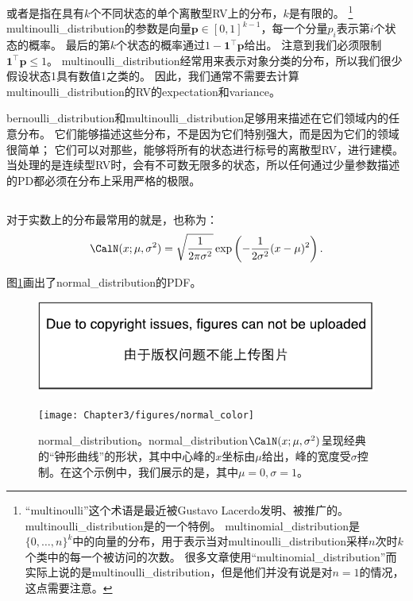 或者是指在具有$k$个不同状态的单个离散型\gls{RV}上的分布，$k$是有限的。
\footnote{``multinoulli''这个术语是最近被Gustavo Lacerdo发明、被\cite{MurphyBook2012}推广的。
\gls{multinoulli_distribution}是的一个特例。
\gls{multinomial_distribution}是$\{0,\ldots, n\}^k$中的向量的分布，用于表示当对\gls{multinoulli_distribution}采样$n$次时$k$个类中的每一个被访问的次数。
很多文章使用``\gls{multinomial_distribution}''而实际上说的是\gls{multinoulli_distribution}，但是他们并没有说是对$n=1$的情况，这点需要注意。}
\gls{multinoulli_distribution}的参数是向量$\bm{p} \in [0, 1]^{k-1}$，每一个分量$p_i$表示第$i$个状态的概率。
最后的第$k$个状态的概率通过$1-\bm{1}^\top \bm{p}$给出。
注意到我们必须限制$\bm{1}^\top\bm{p}\le 1$。
\gls{multinoulli_distribution}经常用来表示对象分类的分布，所以我们很少假设状态1具有数值1之类的。
因此，我们通常不需要去计算\gls{multinoulli_distribution}的\gls{RV}的\gls{expectation}和\gls{variance}。


\gls{bernoulli_distribution}和\gls{multinoulli_distribution}足够用来描述在它们领域内的任意分布。
它们能够描述这些分布，不是因为它们特别强大，而是因为它们的领域很简单；
它们可以对那些，能够将所有的状态进行标号的离散型\gls{RV}，进行建模。
当处理的是连续型\gls{RV}时，会有不可数无限多的状态，所以任何通过少量参数描述的\gls{PD}都必须在分布上采用严格的极限。

\subsection{}
\label{sec:gaussian_distribution}


对于实数上的分布最常用的就是，也称为：
\begin{equation}
\CalN(x; \mu, \sigma^2) = \sqrt{\frac{1}{2\pi \sigma^2}} \exp \left ( -\frac{1}{2\sigma^2} (x-\mu)^2 \right ).
\end{equation}

图\ref{fig:chap3_normal_color}画出了\gls{normal_distribution}的\gls{PDF}。
\begin{figure}[!htb]
\ifOpenSource
\centerline{\includegraphics{figure.pdf}}
\else
\centerline{\texttt{[image: Chapter3/figures/normal\_color]}}
\fi
\captionsetup{singlelinecheck=off}
\caption[.]{\gls{normal_distribution}。\gls{normal_distribution}$\CalN(x; \mu, \sigma^2)$呈现经典的``钟形曲线''的形状，其中中心峰的$x$坐标由$\mu$给出，峰的宽度受$\sigma$控制。在这个示例中，我们展示的是，其中$\mu=0, \sigma = 1$。}
\label{fig:chap3_normal_color}
\end{figure}


